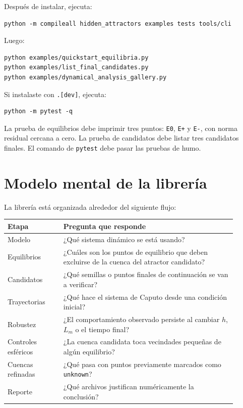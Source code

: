 \documentclass[11pt,letterpaper]{article}
\begin{document}
Después de instalar, ejecuta:

\begin{lstlisting}[style=terminal]
python -m compileall hidden_attractors examples tests tools/cli
\end{lstlisting}

Luego:

\begin{lstlisting}[style=terminal]
python examples/quickstart_equilibria.py
python examples/list_final_candidates.py
python examples/dynamical_analysis_gallery.py
\end{lstlisting}

Si instalaste con \texttt{.[dev]}, ejecuta:

\begin{lstlisting}[style=terminal]
python -m pytest -q
\end{lstlisting}

\begin{resultado}
La prueba de equilibrios debe imprimir tres puntos: \texttt{E0}, \texttt{E+} y \texttt{E-}, con norma residual cercana a cero. La prueba de candidatos debe listar tres candidatos finales. El comando de \texttt{pytest} debe pasar las pruebas de humo.
\end{resultado}

\section{Modelo mental de la librería}

La librería está organizada alrededor del siguiente flujo:

\begin{center}
\begin{tabular}{p{0.22\linewidth}p{0.68\linewidth}}
\toprule
Etapa & Pregunta que responde \\
\midrule
Modelo & ¿Qué sistema dinámico se está usando? \\
Equilibrios & ¿Cuáles son los puntos de equilibrio que deben excluirse de la cuenca del atractor candidato? \\
Candidatos & ¿Qué semillas o puntos finales de continuación se van a verificar? \\
Trayectorias & ¿Qué hace el sistema de Caputo desde una condición inicial? \\
Robustez & ¿El comportamiento observado persiste al cambiar $h$, $L_m$ o el tiempo final? \\
Controles esféricos & ¿La cuenca candidata toca vecindades pequeñas de algún equilibrio? \\
Cuencas refinadas & ¿Qué pasa con puntos previamente marcados como \texttt{unknown}? \\
Reporte & ¿Qué archivos justifican numéricamente la conclusión? \\
\bottomrule
\end{tabular}
\end{center}
\end{document}
